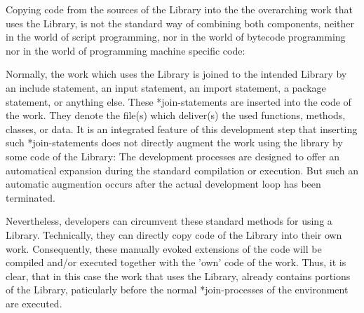 Copying code from the sources of the Library into the the overarching work that
uses the Library, is not the standard way of combining both components, neither
in the world of script programming, nor in the world of bytecode programming
nor in the world of programming machine specific code:

Normally, the work which uses the Library is joined to the intended Library by
an include statement, an input statement, an import statement, a package
statement, or anything else. These *join-statements are inserted into the code
of the work. They denote the file(s) which deliver(s) the used functions,
methods, classes, or data. It is an integrated feature of this development step
that inserting such *join-statements does not directly augment the work using
the library by some code of the Library: The development processes are designed
to offer an automatical expansion during the standard compilation or execution.
But such an automatic augmention occurs after the actual development loop has
been terminated.

Nevertheless, developers can circumvent these standard methods for using a
Library. Technically, they can directly copy code of the Library into their own
work. Consequently, these manually evoked extensions of the code will be
compiled and/or executed together with the 'own' code of the work. Thus, it is clear,
that in this case the work that uses the Library, already contains portions of
the Library, paticularly before the normal *join-processes of the environment
are executed.

